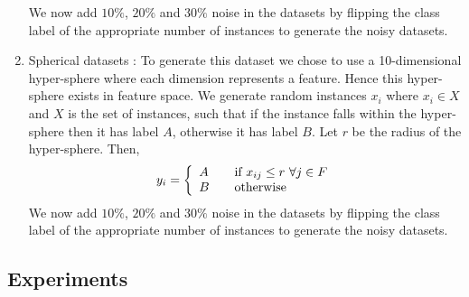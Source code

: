 \documentclass[letterpaper,11pt]{article}
\begin{document}
\begin{enumerate}
We now add $10\%$, $20\%$ and $30\%$ noise in the datasets by flipping the class label of the appropriate number of instances to generate the noisy datasets.
\item Spherical datasets : To generate this dataset we chose to use a 10-dimensional hyper-sphere where each dimension represents a feature. Hence this hyper-sphere exists in feature space. We generate random instances $x_i$ where $x_i \in X$ and $X$ is the set of instances, such that if the instance falls within the hyper-sphere then it has label $A$, otherwise it has label $B$. Let $r$ be the radius of the hyper-sphere. Then, 
\begin{align}
y_i = \left\{ 
  \begin{array}{l l}
    A & \quad \text{if $x_{ij} \le r \text{   } \forall j \in F$}\\
    B & \quad \text{otherwise}
  \end{array} \right.
\end{align}
We now add $10\%$, $20\%$ and $30\%$ noise in the datasets by flipping the class label of the appropriate number of instances to generate the noisy datasets.
\end{enumerate}

\pagebreak
\subsection{Experiments}
\end{document}
